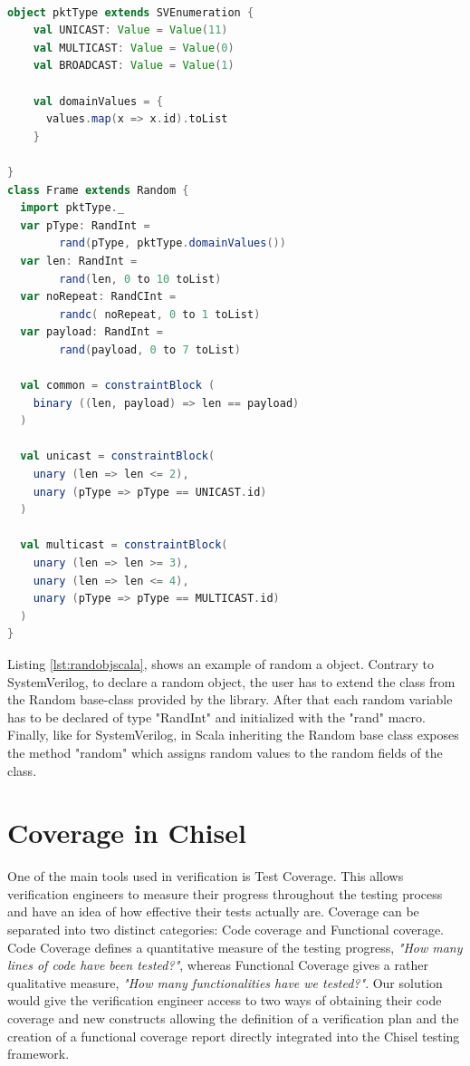 \documentclass[conference]{IEEEtran}
\begin{document}
\begin{lstlisting}[language=scala, caption={Random object in Scala}, label={lst:randobjscala}]

object pktType extends SVEnumeration {
    val UNICAST: Value = Value(11)
    val MULTICAST: Value = Value(0)
    val BROADCAST: Value = Value(1)
    
    val domainValues = {
      values.map(x => x.id).toList
    }

}
class Frame extends Random {
  import pktType._
  var pType: RandInt = 
        rand(pType, pktType.domainValues())
  var len: RandInt = 
        rand(len, 0 to 10 toList)
  var noRepeat: RandCInt = 
        randc( noRepeat, 0 to 1 toList)
  var payload: RandInt =
        rand(payload, 0 to 7 toList)

  val common = constraintBlock (
    binary ((len, payload) => len == payload)
  )

  val unicast = constraintBlock(
    unary (len => len <= 2),
    unary (pType => pType == UNICAST.id)
  )

  val multicast = constraintBlock(
    unary (len => len >= 3),
    unary (len => len <= 4),
    unary (pType => pType == MULTICAST.id)
  )
}
\end{lstlisting}

Listing \ref{lst:randobjscala}, shows an example of random a object. Contrary to SystemVerilog, to declare a random object, the user has to extend
the class from the Random base-class provided by the library. After that each random variable has to be declared of type "RandInt" and initialized
with the "rand" macro. Finally, like for SystemVerilog, in Scala inheriting the Random base class exposes the method "random" which assigns random
values to the random fields of the class.

\section{Coverage in Chisel}
One of the main tools used in verification is Test Coverage. This allows verification engineers to measure their progress throughout the testing process and have an idea of how effective their tests actually are. Coverage can be separated into two distinct categories: Code coverage and Functional coverage. Code Coverage defines a quantitative measure of the testing progress, \textit{"How many lines of code have been tested?"}, whereas Functional Coverage gives a rather qualitative measure, \textit{"How many functionalities have we tested?"}.  Our solution would give the verification engineer access to two ways of obtaining their code coverage and new constructs allowing the definition of a verification plan and the creation of a functional coverage report directly integrated into the Chisel testing framework.\\
\end{document}
